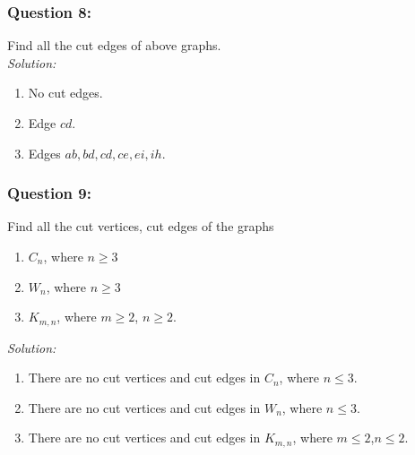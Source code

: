\documentclass[a4paper]{article}
\begin{document}
	\subsubsection*{Question 8:}
	Find all the cut edges of above graphs. \\
	\emph{Solution:} 
	\begin{enumerate}[label = \alph*)]
	    \item No cut edges.
	    \item Edge $cd$.
	    \item Edges $ab, bd, cd , ce, ei, ih$.
	\end{enumerate}
	\subsubsection*{Question 9:}
	Find all the cut vertices, cut edges of the graphs
	\begin{enumerate}[label=\alph*)]
		\item $C_n$, where $n \geq 3$
		\item $W_n$, where $n \geq 3$
		\item $K_{m, n}$, where $m \geq 2$, $n \geq 2$.
	\end{enumerate}
	\emph{Solution:} 
	\begin{enumerate}[label = \alph*)]
	    \item There are no cut vertices and cut edges in $C_n$, where $n \leq 3$.
	    \item There are no cut vertices and cut edges in $W_n$, where $n \leq 3$.
	    \item There are no cut vertices and cut edges in $K_{m,n}$, where $m \leq 2$,$n \leq 2$.
    \end{enumerate}
\end{document}
